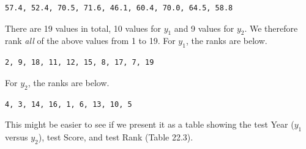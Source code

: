 \documentclass[
  openany]{krantz}
\begin{document}
\begin{verbatim}
57.4, 52.4, 70.5, 71.6, 46.1, 60.4, 70.0, 64.5, 58.8
\end{verbatim}

There are 19 values in total, 10 values for \(y_{1}\) and 9 values for \(y_{2}\).
We therefore rank \emph{all} of the above values from 1 to 19.
For \(y_{1}\), the ranks are below.

\begin{verbatim}
2, 9, 18, 11, 12, 15, 8, 17, 7, 19
\end{verbatim}

For \(y_{2}\), the ranks are below.

\begin{verbatim}
4, 3, 14, 16, 1, 6, 13, 10, 5
\end{verbatim}

This might be easier to see if we present it as a table showing the test Year (\(y_{1}\) versus \(y_{2}\)), test Score, and test Rank (Table 22.3).
\end{document}
